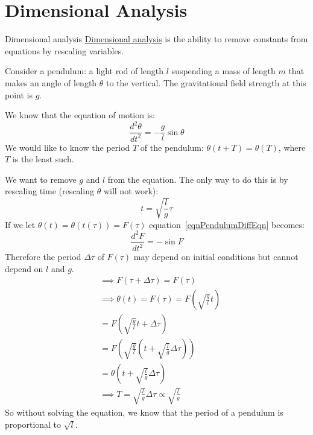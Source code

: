 \documentclass[../Main.tex]{subfiles}
\begin{document}
\section{Dimensional Analysis}
\label{sectDimAnalysis}
\begin{definition}{Dimensional analysis}
    \underline{Dimensional analysis} is the ability to remove constants from equations by rescaling variables.
\end{definition}
\begin{example}
    Consider a pendulum: a light rod of length $l$ suspending a mass of length $m$ that makes an angle of length $\theta$ to the vertical. The gravitational field strength at this point is $g$.\par
    We know that the equation of motion is:
    \begin{equation}
        \frac{d^2\theta}{dt^2} = -\frac{g}{l}\sin{\theta}
        \label{eqnPendulumDiffEqn}
    \end{equation}
    We would like to know the period $T$ of the pendulum: $\theta(t + T) = \theta(T)$, where $T$ is the least such.\par
    We want to remove $g$ and $l$ from the equation. The only way to do this is by rescaling time (rescaling $\theta$ will not work):
    \begin{equation*}
        t = \sqrt{\frac{l}{g}}\tau
    \end{equation*}
    If we let $\theta(t) = \theta(t(\tau)) = F(\tau)$ equation~\ref{eqnPendulumDiffEqn} becomes:
    \begin{equation*}
        \frac{d^2 F}{dt^2} = -\sin{F}
    \end{equation*}
    Therefore the period $\Delta \tau$ of $F(\tau)$ may depend on initial conditions but cannot depend on $l$ and $g$.
    \begin{align*}
        &\implies F(\tau + \Delta\tau) = F(\tau) \\
        &\implies \theta(t) = F(\tau) = F\left(\sqrt{\frac{g}{l}}t\right) \\
        &= F\left(\sqrt{\frac{g}{l}}t + \Delta\tau\right) \\
        &= F\left(\sqrt{\frac{g}{l}}\left(t + \sqrt{\frac{l}{g}} \Delta \tau\right)\right) \\
        &= \theta\left(t + \sqrt{\frac{l}{g}}\Delta\tau\right) \\
        &\implies T = \sqrt{\frac{l}{g}} \Delta \tau \propto \sqrt{\frac{l}{g}}
    \end{align*}
    So without solving the equation, we know that the period of a pendulum is proportional to $\sqrt{l}$.\par
\end{example}
\end{document}
